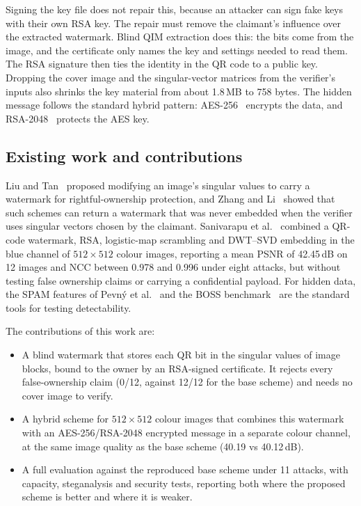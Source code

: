 \documentclass[11pt,a4paper]{article}
\begin{document}
Signing the key file does not repair this, because an attacker can sign fake keys with their own RSA key. The repair must remove the claimant's influence over the extracted watermark. Blind QIM extraction does this: the bits come from the image, and the certificate only names the key and settings needed to read them. The RSA signature then ties the identity in the QR code to a public key. Dropping the cover image and the singular-vector matrices from the verifier's inputs also shrinks the key material from about 1.8\,MB to 758 bytes. The hidden message follows the standard hybrid pattern: AES-256~\cite{fips197} encrypts the data, and RSA-2048~\cite{rfc8017} protects the AES key.

\subsection{Existing work and contributions}\label{sec:intro-related}

Liu and Tan~\cite{liu2002svd} proposed modifying an image's singular values to carry a watermark for rightful-ownership protection, and Zhang and Li~\cite{zhang2005comments} showed that such schemes can return a watermark that was never embedded when the verifier uses singular vectors chosen by the claimant. Sanivarapu et al.~\cite{sanivarapu2022} combined a QR-code watermark, RSA, logistic-map scrambling and DWT--SVD embedding in the blue channel of $512\times512$ colour images, reporting a mean PSNR of 42.45\,dB on 12 images and NCC between 0.978 and 0.996 under eight attacks, but without testing false ownership claims or carrying a confidential payload. For hidden data, the SPAM features of Pevn\'y et al.~\cite{pevny2010spam} and the BOSS benchmark~\cite{bas2011boss} are the standard tools for testing detectability. %

The contributions of this work are:
\begin{itemize}
  \item A blind watermark that stores each QR bit in the singular values of image blocks, bound to the owner by an RSA-signed certificate. It rejects every false-ownership claim (0/12, against 12/12 for the base scheme) and needs no cover image to verify.
  \item A hybrid scheme for $512\times512$ colour images that combines this watermark with an AES-256/RSA-2048 encrypted message in a separate colour channel, at the same image quality as the base scheme (40.19 vs 40.12\,dB).
  \item A full evaluation against the reproduced base scheme under 11 attacks, with capacity, steganalysis and security tests, reporting both where the proposed scheme is better and where it is weaker.
\end{itemize}
\end{document}
